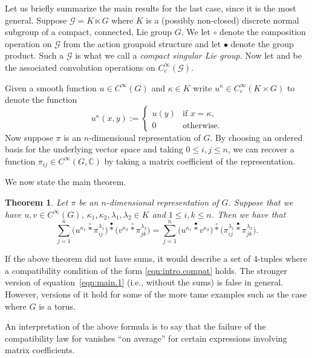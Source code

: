 \documentclass[pdftex]{sigma}
\numberwithin{equation}{section}
\newtheorem{Theorem}{Theorem}[section]
\theoremstyle{definition}
\newcommand{\BBC}{\mathbb{C}}
\newcommand{\CG}{\mathcal{G}}
\newcommand{\stardot}{\overset{{\bullet}}{*}}
\newcommand{\starcirc}{\overset{\circ}{*}}
\begin{document}
Let us briefly summarize the main results for the last case, since it is the most general. Suppose $ \CG = K \ltimes G $ where $ K $ is a (possibly non-closed) discrete normal subgroup of a compact, connected, Lie group $ G $. We let $ \circ $ denote the composition operation on $ \CG $ from the action groupoid structure and let $ \bullet $ denote the group product. Such a $ \CG $ is what we call a \emph{compact singular Lie group}. Now let \smash{$ \starcirc $} and \smash{$ \stardot $} be the associated convolution operations on $ C_c^\infty(\CG) $.

Given a smooth function $ u \in C^\infty(G) $ and $ \kappa \in K $ write $ u^\kappa \in C^\infty_c(K \times G) $ to denote the function
\[
u^\kappa (x,y) :=
\begin{cases}
  u(y)  & \text{if } x = \kappa, \\
  0  & \text{otherwise}.
\end{cases}
\]
Now suppose $ \pi $ is an $ n $-dimensional representation of $ G $. By choosing an ordered basis for the underlying vector space and taking $ 0 \le i,j \le n $, we can recover a function $ \pi_{ij} \in C^\infty(G, \BBC) $ by taking a matrix coefficient of the representation.

We now state the main theorem.

\begin{Theorem}
Let $ \pi $ be an $ n$-dimensional representation of $ G $. Suppose that we have $u,v \in C^\infty(G)$, $ \kappa_1, \kappa_2, \lambda_1, \lambda_2 \in K $ and
$ 1 \le i, k \le n$.
Then we have that
  \begin{equation}\label{eqn:main.1}
   \sum_{j = 1}^{n} \big( u^{\kappa_1} \starcirc \pi_{ij}^{\lambda_1} \big) \stardot \big( v^{\kappa_2} \starcirc \pi_{jk}^{\lambda_2} \big) =   \sum_{j = 1}^{n} \big( u^{\kappa_1} \stardot  v^{\kappa_2} \big) \starcirc \big(\pi_{ij}^{\lambda_1} \stardot \pi_{jk}^{\lambda_2} \big).
  \end{equation}
\end{Theorem}
If the above theorem did not have sums, it would describe a set of 4-tuples where a compatibility condition of the form \eqref{eqn:intro.compat} holds. The stronger version of equation~\eqref{eqn:main.1} (i.e., without the sums) is false in general. However, versions of it hold for some of the more tame examples such as the case where $ G $ is a torus.

An interpretation of the above formula is to say that the failure of the compatibility law for vanishes ``on average'' for certain expressions involving matrix coefficients.
\end{document}
